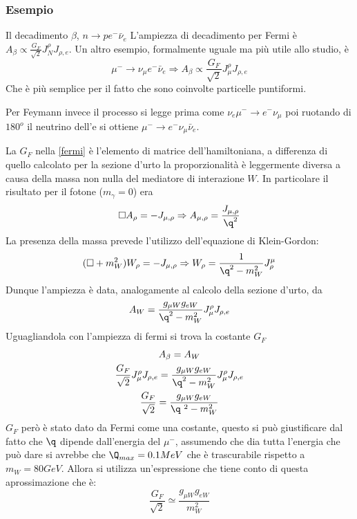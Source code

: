 \documentclass[12pt]{book}
\begin{document}
\subsubsection{Esempio} 
Il decadimento $\beta$, $n \rightarrow p e^- \bar \nu_e$
L'ampiezza di decadimento per Fermi è $A_\beta \propto \frac{G_F}{\sqrt{2}} J_N^\rho J_{\rho,e}$.
Un altro esempio, formalmente uguale ma più utile allo studio, è
\begin{equation} \label{fermi}
	\mu^- \rightarrow\nu_\mu e^- \bar \nu_e \Longrightarrow 	\boxed{A_\beta \propto \frac{G_F}{\sqrt{2}} J_\mu^\rho J_{\rho ,e}}
\end{equation}
Che è più semplice per il fatto che sono coinvolte particelle puntiformi.

Per Feymann invece il processo si legge prima come $\nu_e \mu^- \rightarrow e^- \nu_ \mu $ poi ruotando di $180^o$ il neutrino dell'e si ottiene $\mu^- \rightarrow e^- \nu_\mu \bar \nu_e$.

La $G_F$ nella \eqref{fermi} è l'elemento di matrice dell'hamiltoniana, a differenza di quello calcolato per la sezione d'urto la proporzionalità è leggermente diversa a causa della massa non nulla del mediatore di interazione $W$. In particolare il risultato per il fotone ($m_\gamma =0$) era
\begin{equation}
	\square A_\rho = - J_{\mu,\rho} \Rightarrow A_{\mu, \rho}= \frac{J_{\mu, \rho}}{\q^2}
\end{equation}
La presenza della massa prevede l'utilizzo dell'equazione di Klein-Gordon:
\begin{gather}
	( \square + m^2_W ) W_\rho = -J_{\mu, \rho} \Rightarrow W_\rho = \frac{1}{\q^2 -m_W^2} J^\mu_\rho
\end{gather}
Dunque l'ampiezza è data, analogamente al calcolo della sezione d'urto, da
\begin{equation}
	A_W = \frac{g_{\mu W}g_{eW}}{\q^2 -m_W^2} J_\mu^\rho J_{\rho,e}
\end{equation}
Uguagliandola con l'ampiezza di fermi si trova la costante $G_F$ 
\begin{gather}
	A_\beta = A_W\\
	 \frac{G_F}{\sqrt{2}} J_\mu^\rho J_{\rho ,e} = \frac{g_{\mu W}g_{eW}}{\q^2 -m_W^2} J_\mu^\rho J_{\rho,e}\\
	 \frac{G_F}{\sqrt{2}} = \frac{g_{\mu W}g_{eW}}{\q \ ^2 -m_W^2}
\end{gather}
$G_F$ però è stato dato da Fermi come una costante, questo si può giustificare dal fatto che $\q$ dipende dall'energia del $\mu^-$, assumendo che dia tutta l'energia che può dare si avrebbe che $\Q_{max} = 0.1 MeV$ che è trascurabile rispetto a $m_W=80GeV$. Allora si utilizza un'espressione che tiene conto di questa aprossimazione che è:
\begin{equation}
	\frac{G_F}{\sqrt{2}} \simeq \frac{g_{\mu W} g_{e W}}{m^2_W}
\end{equation}
\end{document}
